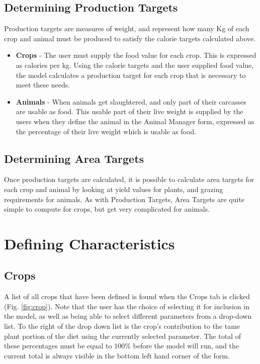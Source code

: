   \subsection{Determining Production Targets}
    Production targets are measures of weight, and represent how many Kg of each
    crop and animal must be produced to satisfy the calorie targets calculated
    above.
  \begin{itemize}
    \item \textbf{Crops} - The user must supply the food value for each crop.  This
      is expressed as calories per kg.  Using the calorie targets and the user supplied
      food value, the model calculates a production target for each crop that is necessary
      to meet these needs.
    \item \textbf{Animals} - When animals get slaughtered, and only part of their
      carcasses are usable as
      food.  This usable part of their live weight is supplied by the users when they
      define the animal in the Animal Manager form, expressed as the percentage of
      their live weight which is usable as food.
  \end{itemize}

  \subsection{Determining Area Targets}
  Once production targets are calculated, it is possible to calculate area
  targets for each crop and animal by looking at yield values for plants, and
  grazing requirements for animals.  As with Production Targets, Area Targets are
  quite simple to compute for crops, but get very complicated for animals.

\section{Defining Characteristics}
 \subsection{Crops}
    A list of all crops that have been defined is found when the Crops tab is
    clicked (Fig. \ref{fig:crop}).  Note that the user has the choice of
    selecting it for inclusion in the model, as well as being able to select
    different parameters from a drop-down list.  To the right of the drop down
    list is the crop's contribution to the tame plant portion of the diet using
    the currently selected parameter.  The total of these percentages must be
    equal to $100\%$ before the model will run, and the current total is always
    visible in the bottom left hand corner of the form.

